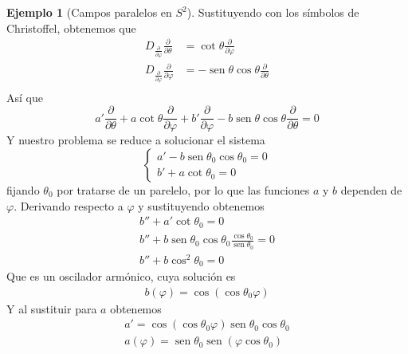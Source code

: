 \documentclass[spanish]{book}
\theoremstyle{definition}
\newtheorem*{ejem}{Ejemplo}
\DeclareMathOperator{\sen}{sen}
\begin{document}
\begin{ejem}[Campos paralelos en $S^2$]
		Sustituyendo con los símbolos de Christoffel, obtenemos que
		\begin{align*}
			D_{\frac{\partial}{\partial \varphi}}\frac{\partial}{\partial \theta}&=\cot\theta\frac{\partial}{\partial \varphi}\\
			D_{\frac{\partial}{\partial \varphi}}\frac{\partial}{\partial \varphi}&=-\sen\theta\cos\theta\frac{\partial}{\partial \theta}\\
		\end{align*}
		Así que
		\[a'\frac{\partial}{\partial\theta}+a\cot\theta\frac{\partial}{\partial \varphi}+b'\frac{\partial}{\partial\varphi}-b\sen\theta\cos\theta\frac{\partial}{\partial \theta}=0\]
		Y nuestro problema se reduce a solucionar el sistema
		\[\begin{cases}
			a'-b\sen\theta_0\cos\theta_0=0\\
			b'+a\cot\theta_0=0
		\end{cases}\]
		fijando $\theta_0$ por tratarse de un parelelo, por lo que las funciones $a$ y $b$ dependen de $\varphi$. Derivando respecto a $\varphi$ y sustituyendo obtenemos
		\begin{align*}
			b''+a'\cot\theta_0=0\\
			b''+b\sen\theta_0\cos\theta_0\frac{\cos\theta_0}{\sen\theta_0}=0\\
			b''+b\cos^2\theta_0=0
		\end{align*}
		Que es un oscilador armónico, cuya solución es
		\begin{align*}
			b(\varphi)=\cos(\cos\theta_0\varphi)
		\end{align*}
		Y al sustituir para $a$ obtenemos
		\begin{align*}
			a'=\cos(\cos\theta_0\varphi)\sen\theta_0\cos\theta_0\\
			a(\varphi)=\sen\theta_0\sen(\varphi\cos\theta_0)
		\end{align*}
		

\end{ejem}
\end{document}
